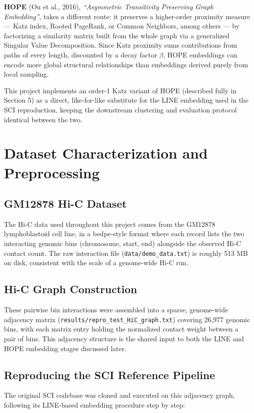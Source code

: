 \documentclass[12pt]{article}
\begin{document}
\textbf{HOPE} (Ou et al., 2016), \textit{``Asymmetric Transitivity Preserving Graph Embedding''},
takes a different route: it preserves a higher-order proximity measure — Katz index, Rooted
PageRank, or Common Neighbors, among others — by factorizing a similarity matrix built from the
whole graph via a generalized Singular Value Decomposition. Since Katz proximity sums
contributions from paths of every length, discounted by a decay factor $\beta$, HOPE embeddings
can encode more global structural relationships than embeddings derived purely from local
sampling.

This project implements an order-1 Katz variant of HOPE (described fully in Section 5) as a
direct, like-for-like substitute for the LINE embedding used in the SCI reproduction, keeping the
downstream clustering and evaluation protocol identical between the two.

\section{Dataset Characterization and Preprocessing}

\subsection{GM12878 Hi-C Dataset}
The Hi-C data used throughout this project comes from the GM12878 lymphoblastoid cell line, in a
bedpe-style format where each record lists the two interacting genomic bins (chromosome, start,
end) alongside the observed Hi-C contact count. The raw interaction file
(\texttt{data/demo\_data.txt}) is roughly 513 MB on disk, consistent with the scale of a
genome-wide Hi-C run.

\subsection{Hi-C Graph Construction}
These pairwise bin interactions were assembled into a sparse, genome-wide adjacency matrix
(\texttt{results/repro\_test\_HiC\_graph.txt}) covering 26,977 genomic bins, with each matrix
entry holding the normalized contact weight between a pair of bins. This adjacency structure is
the shared input to both the LINE and HOPE embedding stages discussed later.

\subsection{Reproducing the SCI Reference Pipeline}
The original SCI codebase was cloned and executed on this adjacency graph, following its
LINE-based embedding procedure step by step:
\end{document}
